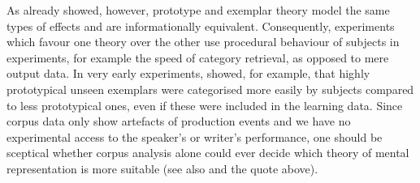 As \cite{Barsalou1990} already showed, however, prototype and exemplar theory model the same types of effects and are informationally equivalent.
Consequently, experiments which favour one theory over the other use procedural behaviour of subjects in experiments, for example the speed of category retrieval, as opposed to mere output data.
In very early experiments, \cite{PosnerKeele1968} showed, for example, that highly prototypical unseen exemplars were categorised more easily by subjects compared to less prototypical ones, even if these were included in the learning data.
Since corpus data only show artefacts of production events and we have no experimental access to the speaker's or writer's performance, one should be sceptical whether corpus analysis alone could ever decide which theory of mental representation is more suitable (see also \citealp[22]{Gries2003} and the \citealp[486--487]{Dabrowska2016} quote above).

